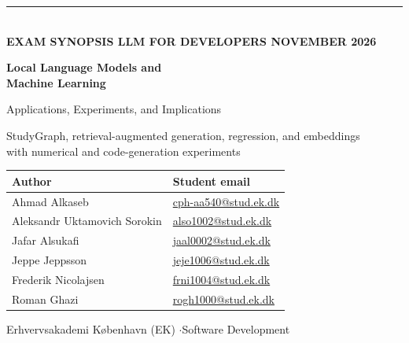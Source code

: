 \documentclass[10pt,a4paper]{article}
\begin{document}
\thispagestyle{empty}
{\color{EKBlue}\rule{\textwidth}{1.4pt}}\\[-1pt]
{\small\textbf{EXAM SYNOPSIS \hfill LLM FOR DEVELOPERS \hfill NOVEMBER 2026}}

\vspace{7mm}
{\color{EKBlue}\Huge\bfseries Local Language Models and\\Machine Learning\par}
\vspace{2mm}
{\Large Applications, Experiments, and Implications\par}
\vspace{3mm}
{\normalsize StudyGraph, retrieval-augmented generation, regression, and embeddings\\with numerical and code-generation experiments\par}

\vspace{7mm}
\begin{center}
\footnotesize
\begin{tabular}{@{}ll@{}}
\toprule
\textbf{Author} & \textbf{Student email}\\
\midrule
Ahmad Alkaseb & \href{mailto:cph-aa540@stud.ek.dk}{cph-aa540@stud.ek.dk}\\
Aleksandr Uktamovich Sorokin & \href{mailto:also1002@stud.ek.dk}{also1002@stud.ek.dk}\\
Jafar Alsukafi & \href{mailto:jaal0002@stud.ek.dk}{jaal0002@stud.ek.dk}\\
Jeppe Jeppsson & \href{mailto:jeje1006@stud.ek.dk}{jeje1006@stud.ek.dk}\\
Frederik Nicolajsen & \href{mailto:frni1004@stud.ek.dk}{frni1004@stud.ek.dk}\\
Roman Ghazi & \href{mailto:rogh1000@stud.ek.dk}{rogh1000@stud.ek.dk}\\
\bottomrule
\end{tabular}
\end{center}
\vspace{2mm}
\centerline{\small Erhvervsakademi København (EK) \quad$\cdot$\quad Software Development}

\vspace{4mm}
\end{document}
